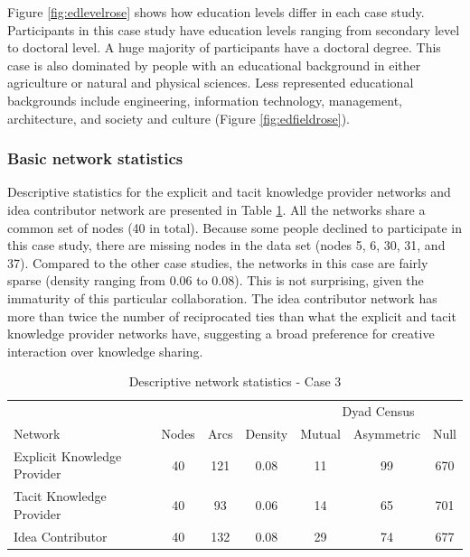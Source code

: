 Figure \ref{fig:edlevelrose} shows how education levels differ in each case study. Participants in this case study have education levels ranging from secondary level to doctoral level. A huge majority of participants have a doctoral degree. This case is also dominated by people with an educational background in either agriculture or natural and physical sciences. Less represented educational backgrounds include engineering, information technology, management, architecture, and society and culture (Figure \ref{fig:edfieldrose}).

\subsubsection{Basic network statistics}

Descriptive statistics for the explicit and tacit knowledge provider networks and idea contributor network are presented in Table \ref{ds_c3}. All the networks share a common set of nodes (40 in total). Because some people declined to participate in this case study, there are missing nodes in the data set (nodes 5, 6, 30, 31, and 37). Compared to the other case studies, the networks in this case are fairly sparse (density ranging from 0.06 to 0.08). This is not surprising, given the immaturity of this particular collaboration. The idea contributor network has more than twice the number of reciprocated ties than what the explicit and tacit knowledge provider networks have, suggesting a broad preference for creative interaction over knowledge sharing.\medskip

\begin{table}[]
	\small
	\centering
	\caption{Descriptive network statistics - Case 3}
	\label{ds_c3}
	\begin{tabular}{@{}lcccccc@{}}
		\toprule
		& \multicolumn{1}{l}{} & \multicolumn{1}{l}{} & \multicolumn{1}{l}{} & \multicolumn{3}{c}{Dyad Census}	\\ \cline{5-7}
		Network						& Nodes			& Arcs			& Density	& Mutual		& Asymmetric	& Null		\\ \midrule
		Explicit Knowledge Provider & 40			& 121			& 0.08		& 11			& 99			& 670		\\
		Tacit Knowledge Provider    & 40			& 93			& 0.06		& 14			& 65			& 701		\\
		Idea Contributor            & 40			& 132			& 0.08		& 29			& 74			& 677		\\ \bottomrule
	\end{tabular}
\end{table}

